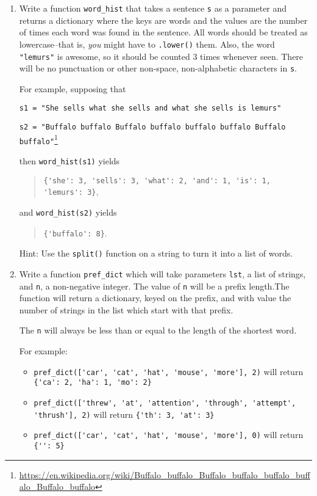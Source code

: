 \documentclass{article}
\begin{document}
\begin{enumerate}
\item Write a function \verb|word_hist| that takes a sentence \verb|s| as a parameter and
  returns a dictionary where the keys are words and the values are the
  number of times each word was found in the sentence. All words
  should be treated as lowercase--that is, \emph{you} might have to \verb|.lower()| them. Also, the word \verb|"lemurs"| is awesome,
  so it should be counted 3 times whenever seen. There will be no punctuation or other non-space, non-alphabetic characters in \verb|s|.

For example, supposing that


\verb|s1 = "She sells what she sells and what she sells is lemurs"|

\verb|s2 = "Buffalo buffalo Buffalo buffalo buffalo buffalo Buffalo buffalo"|\footnote{\url{https://en.wikipedia.org/wiki/Buffalo_buffalo_Buffalo_buffalo_buffalo_buffalo_Buffalo_buffalo}}

then \verb|word_hist(s1)| yields
\begin{quote}
  \verb|{'she': 3, 'sells': 3, 'what': 2, 'and': 1, 'is': 1, 'lemurs': 3}|,
\end{quote}

and \verb|word_hist(s2)| yields
\begin{quote}
\verb|{'buffalo': 8}|.
\end{quote}

Hint: Use the \verb|split()| function on a string to turn it into a
list of words.

\item  Write a function \verb|pref_dict| which will take parameters \verb|lst|, a list of strings, and \verb|n|, a non-negative integer. The value of \verb|n| will be a prefix length.The function will return a dictionary, keyed on the prefix, and with value the number of strings in the list which start with that prefix.

The \verb|n| will always be less than or equal to the length of the shortest word.

For example:

\begin{itemize}
  \item  \verb|pref_dict(['car', 'cat', 'hat', 'mouse', 'more'], 2)| will return \verb|{'ca': 2, 'ha': 1, 'mo': 2}|
  \item  \verb|pref_dict(['threw', 'at', 'attention', 'through', 'attempt', 'thrush'], 2)| will return \verb|{'th': 3, 'at': 3}|
 \item  \verb|pref_dict(['car', 'cat', 'hat', 'mouse', 'more'], 0)| will return \verb|{'': 5}|
\end{itemize}



\end{enumerate}
\end{document}
